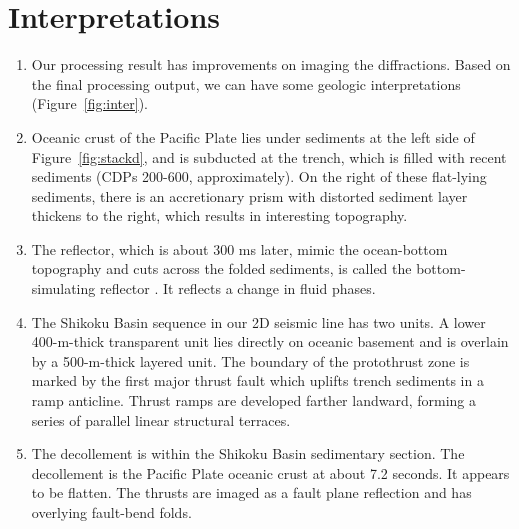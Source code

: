 \section{Interpretations} 

\begin{enumerate}

\item Our processing result has improvements on imaging the diffractions. Based on the final processing output, we can have some geologic interpretations (Figure~\ref{fig:inter}). 

\item Oceanic crust of the Pacific Plate lies under sediments at the left side of Figure~\ref{fig:stackd}, and is subducted at the trench, which is filled with recent sediments (CDPs 200-600, approximately). On the right of these flat-lying sediments, there is an accretionary prism with distorted sediment layer thickens to the right, which results in interesting topography. 

\item The reflector, which is about 300 ms later, mimic the ocean-bottom topography and cuts across the folded sediments, is called the bottom-simulating reflector \cite[]{SU}. It reflects a change in fluid phases.  

\item The Shikoku Basin sequence in our 2D seismic line has two units. A lower 400-m-thick transparent unit lies directly on oceanic basement and is overlain by a 500-m-thick layered unit. The boundary of the protothrust zone is marked by the first major thrust fault which uplifts trench sediments in a ramp anticline. Thrust ramps are developed farther landward, forming a series of parallel linear structural terraces.

\item The decollement is within the Shikoku Basin sedimentary section. The decollement is the Pacific Plate oceanic crust at about 7.2 seconds. It appears to be flatten. The thrusts are imaged as a fault plane reflection and has overlying fault-bend folds.


\end{enumerate}\clearpage
\lstset{language=python,numbers=left,numberstyle=\tiny,showstringspaces=false}





